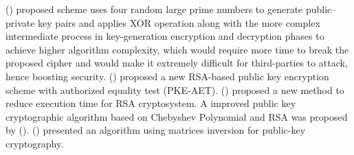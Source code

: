 \documentclass[graybox]{svmult}
\begin{document}
\citeauthor{imam2022} (\citeyear{imam2022}) proposed scheme uses four random large prime numbers to generate public–private key pairs and applies XOR operation along with the more complex intermediate process in key-generation encryption and decryption phases to achieve higher algorithm complexity, which would require more time to break the proposed cipher and would make it extremely difficult for third-parties to attack, hence boosting security.
\citeauthor{park2024new} (\citeyear{park2024new}) proposed a new RSA-based public key encryption scheme with authorized equality test (PKE-AET).\citeauthor{sangeetha2024rsa} (\citeyear{sangeetha2024rsa}) proposed a new method to reduce execution time for RSA cryptosystem. A improved public key cryptographic algorithm based on Chebyshev Polynomial and RSA was proposed by \citeauthor{zhang2024improved} (\citeyear{zhang2024improved}). \citeauthor{haidary2024inverse} (\citeyear{haidary2024inverse}) presented an algorithm using matrices inversion for public-key cryptography.
\end{document}
